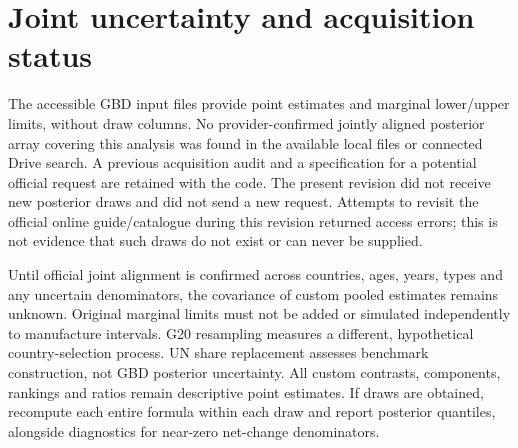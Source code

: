 \documentclass[11pt,a4paper]{article}
\begin{document}
\section{Joint uncertainty and acquisition status}
The accessible GBD input files provide point estimates and marginal lower/upper limits, without draw columns. No provider-confirmed jointly aligned posterior array covering this analysis was found in the available local files or connected Drive search. A previous acquisition audit and a specification for a potential official request are retained with the code. The present revision did not receive new posterior draws and did not send a new request. Attempts to revisit the official online guide/catalogue during this revision returned access errors; this is not evidence that such draws do not exist or can never be supplied.

Until official joint alignment is confirmed across countries, ages, years, types and any uncertain denominators, the covariance of custom pooled estimates remains unknown. Original marginal limits must not be added or simulated independently to manufacture intervals. G20 resampling measures a different, hypothetical country-selection process. UN share replacement assesses benchmark construction, not GBD posterior uncertainty. All custom contrasts, components, rankings and ratios remain descriptive point estimates. If draws are obtained, recompute each entire formula within each draw and report posterior quantiles, alongside diagnostics for near-zero net-change denominators.
\end{document}
